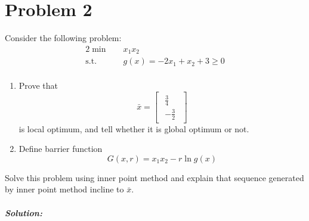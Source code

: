 \documentclass[paper=a4, fontsize=11pt]{scrartcl} %
\numberwithin{equation}{section} %
\numberwithin{figure}{section} %
\numberwithin{table}{section} %
\begin{document}
\section{Problem 2}
Consider the following problem:
\begin{alignat}{2}          \nonumber
\min\quad & x_1x_2 \\    \nonumber
\mbox{s.t.}\quad            \nonumber
& g(x)=-2x_1+x_2+3\geq0\\    \nonumber
\end{alignat}
\begin{enumerate}
\item  Prove that 
\begin{equation} \nonumber
\bar{x} = \begin{bmatrix}\begin{smallmatrix}\frac{3}{4}\\-\frac{3}{2}\end{smallmatrix}\end{bmatrix}
\end{equation}
is local optimum, and tell whether it is global optimum or not.
\item Define barrier function 
\begin{equation}\nonumber
G(x,r)=x_1x_2-r\ln g(x)
\end{equation}
\end{enumerate}
Solve this problem using inner point method and explain that sequence generated by inner point method incline to $\bar{x}$.\\~\\
\emph{\textbf{Solution:}}\\~\\
\end{document}
